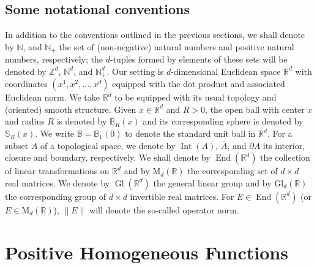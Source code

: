 \documentclass[11pt, letter]{book}
\newcommand\MdR{\mbox{M}_d(\mathbb{R})} %
\newcommand\End{\operatorname{End}} %
\newcommand\GldR{\mbox{Gl}_d(\mathbb{R})}%
\newcommand\Gl{\operatorname{Gl}} %
\newcommand\Interior{\operatorname{Int}}
\begin{document}
\section{Some notational conventions}
In addition to the conventions outlined in the previous sections, we shall denote by $\mathbb{N}$, and $\mathbb{N}_+$ the set of (non-negative) natural numbers and positive natural numbers, respectively; the $d$-tuples formed by elements of these sets will be denoted by $\mathbb{Z}^d$, $\mathbb{N}^d$, and $\mathbb{N}_+^d$. 
Our setting is $d$-dimensional Euclidean space $\mathbb{R}^d$ with coordinates $(x^1,x^2,\dots,x^d)$ equipped with the dot product and associated Euclidean norm. We take $\mathbb{R}^d$ to be equipped with its usual topology and (oriented) smooth structure. Given $x\in\mathbb{R}^d$ and $R>0$, the open ball with center $x$ and radius $R$ is denoted by $\mathbb{B}_R(x)$ and its corresponding sphere is denoted by $\mathbb{S}_R(x)$. We write $\mathbb{B}=\mathbb{B}_1(0)$ to denote the standard unit ball in $\mathbb{R}^d$. For a subset $A$ of a topological space, we denote by $\Interior{(A)}$, $\overline{A}$, and $\partial A$ its interior, closure and boundary, respectively. We shall denote by $\End(\mathbb{R}^d)$ the collection of linear transformations on $\mathbb{R}^d$ and by $\MdR$ the corresponding set of $d\times d$ real matrices. We denote by $\Gl(\mathbb{R}^d)$ the general linear group and by $\GldR$ the corresponding group of $d\times d$ invertible real matrices. For $E\in \End(\mathbb{R}^d)$ (or $E\in\MdR$), $\|E\|$ will denote the so-called operator norm.










\chapter{Positive Homogeneous Functions}\label{chap:pos-hom-fns}
\end{document}
